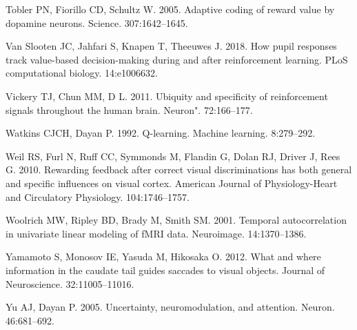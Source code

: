 \documentclass[]{article}
\begin{document}
\leavevmode\hypertarget{ref-Tobleretal2005}{}%
Tobler PN, Fiorillo CD, Schultz W. 2005. Adaptive coding of reward value
by dopamine neurons. Science. 307:1642--1645.

\leavevmode\hypertarget{ref-vanSlootenetal2018}{}%
Van Slooten JC, Jahfari S, Knapen T, Theeuwes J. 2018. How pupil
responses track value-based decision-making during and after
reinforcement learning. PLoS computational biology. 14:e1006632.

\leavevmode\hypertarget{ref-Vickeryetal2011}{}%
Vickery TJ, Chun MM, D L. 2011. Ubiquity and specificity of
reinforcement signals throughout the human brain. Neuron". 72:166--177.

\leavevmode\hypertarget{ref-WatkinsDayan1992}{}%
Watkins CJCH, Dayan P. 1992. Q-learning. Machine learning. 8:279--292.

\leavevmode\hypertarget{ref-Weiletal2010}{}%
Weil RS, Furl N, Ruff CC, Symmonds M, Flandin G, Dolan RJ, Driver J,
Rees G. 2010. Rewarding feedback after correct visual discriminations
has both general and specific influences on visual cortex. American
Journal of Physiology-Heart and Circulatory Physiology. 104:1746--1757.

\leavevmode\hypertarget{ref-Woolrichetal2001}{}%
Woolrich MW, Ripley BD, Brady M, Smith SM. 2001. Temporal
autocorrelation in univariate linear modeling of fMRI data. Neuroimage.
14:1370--1386.

\leavevmode\hypertarget{ref-Yamamotoetal2012}{}%
Yamamoto S, Monosov IE, Yasuda M, Hikosaka O. 2012. What and where
information in the caudate tail guides saccades to visual objects.
Journal of Neuroscience. 32:11005--11016.

\leavevmode\hypertarget{ref-YuDayan2005}{}%
Yu AJ, Dayan P. 2005. Uncertainty, neuromodulation, and attention.
Neuron. 46:681--692.
\end{document}
